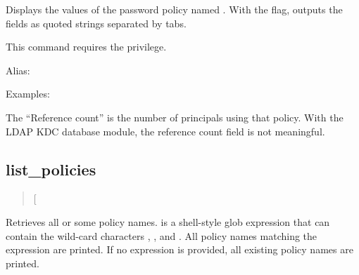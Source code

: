 \documentclass[letterpaper,10pt,english]{sphinxmanual}
\begin{document}
Displays the values of the password policy named .  With the
 flag, outputs the fields as quoted strings separated by
tabs.

This command requires the  privilege.

Alias: 

Examples:

%
\begin{sphinxVerbatim}[commandchars=\\\{\}]
  
 
     
   
   
      
     
  

   
                       
\end{sphinxVerbatim}

The “Reference count” is the number of principals using that policy.
With the LDAP KDC database module, the reference count field is not
meaningful.


\subsection{list\_policies}
\label{\detokenize{admin/database:list-policies}}\begin{quote}

 {[}\sphinxstyleemphasis{expression}{]}
\end{quote}

Retrieves all or some policy names.   is a shell-style
glob expression that can contain the wild-card characters ,
\sphinxcode{*}, and \sphinxcode{{[}{]}}.  All policy names matching the expression are
printed.  If no expression is provided, all existing policy names are
printed.
\end{document}
